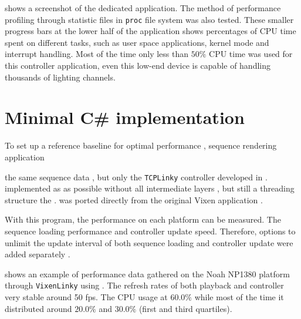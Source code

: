  shows a screenshot of the dedicated application. The method of performance profiling through statistic files in  \texttt{proc} file system was also tested. These smaller progress bars at the lower half of the application shows percentages of CPU time spent on different tasks, such as user space applications, kernel mode and interrupt handling. Most of the time only less than $50 \%$ CPU time was used for this controller application,  even this low-end device is capable of handling thousands of lighting channels.

\section{Minimal C\# implementation}

To set up a reference baseline for optimal performance , sequence rendering application 


 the same  sequence data , but  only the \texttt{TCPLinky} controller developed in .  implemented as  as possible without all intermediate layers , but still  a threading structure  the .  was ported directly from the original Vixen application .


With this program, the  performance  on each platform can be measured. The  sequence loading performance and controller update speed. Therefore, options to unlimit the update interval of both sequence loading and controller update were added separately .

 shows an example of performance data gathered on the Noah NP1380 platform through \texttt{VixenLinky} using . The refresh rates of both playback and controller  very stable around  50 fps. The CPU usage  at $60.0 \%$\ca{,} while most of the time it  distributed around $20.0 \%$ and $30.0 \%$ (first and third quartiles).

